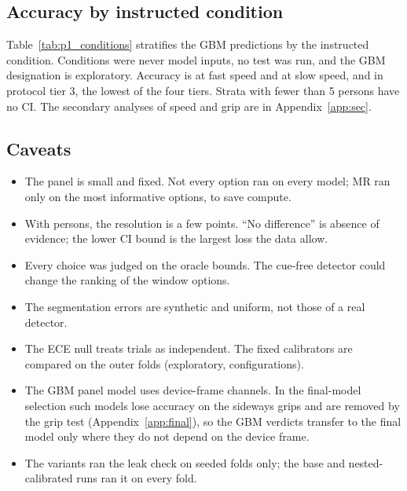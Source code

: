 
\subsection{Accuracy by instructed condition}\label{app:prep:conditions}

Table~\ref{tab:p1_conditions} stratifies the GBM predictions by the instructed condition. Conditions were
never model inputs, no test was run, and the GBM designation is exploratory. Accuracy is
 at fast speed and  at slow speed, and
 in protocol tier 3, the lowest of the four tiers. Strata with fewer than 5 persons have no CI. The
secondary analyses of speed and grip are in Appendix~\ref{app:sec}.


\FloatBarrier
\subsection{Caveats}\label{app:prep:caveats}

\begin{itemize}[nosep]
\item The panel is small and fixed. Not every option ran on every model; MR ran only on the most
  informative options, to save compute.
\item With  persons, the resolution is a few points. ``No difference'' is absence of evidence; the lower
  CI bound is the largest loss the data allow.
\item Every choice was judged on the oracle bounds. The cue-free detector could change the ranking of the
  window options.
\item The segmentation errors are synthetic and uniform, not those of a real detector.
\item The ECE null treats trials as independent. The fixed calibrators are compared on the outer folds
  (exploratory,  configurations).
\item The GBM panel model uses device-frame channels. In the final-model selection such models lose
  accuracy on the sideways grips and are removed by the grip test (Appendix~\ref{app:final}), so the GBM
  verdicts transfer to the final model only where they do not depend on the device frame.
\item The variants ran the leak check on  seeded folds only; the base and
  nested-calibrated runs ran it on every fold.
\end{itemize}
